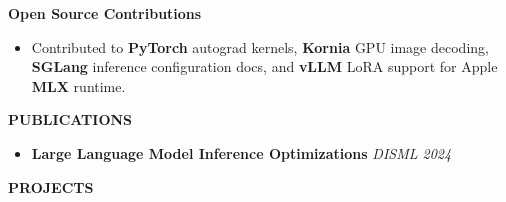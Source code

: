 \documentclass[10pt,a4]{article}
\begin{document}
{\begin{flushleft}
    \vspace{1.0mm}
    \hspace{1.5mm} \textbf{\large Open Source Contributions}
    \begin{itemize}
        \item Contributed to \textbf{PyTorch} autograd kernels, \textbf{Kornia} GPU image decoding, \textbf{SGLang} inference configuration docs, and \textbf{vLLM} LoRA support for Apple \textbf{MLX} runtime.
    \end{itemize}
\end{flushleft}


\vspace{0.5mm}
\begin{flushleft}
    {\Large \textbf{PUBLICATIONS}}
    \vspace{0.5mm}
    \begin{itemize}
        \item \textbf{Large Language Model Inference Optimizations} \hfill \textit{DISML 2024}
    \end{itemize}
\end{flushleft}


\begin{flushleft}
    {\Large \textbf{PROJECTS}}
        \vspace{0.5mm}




\end{flushleft}}
\end{document}
